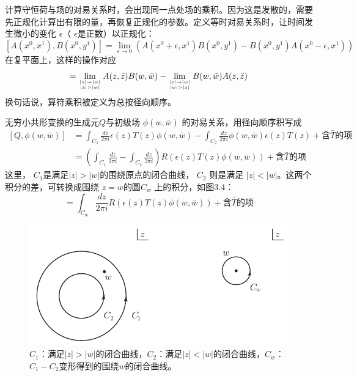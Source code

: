 计算守恒荷与场的对易关系时，会出现同一点处场的乘积。因为这是发散的，需要先正规化计算出有限的量，再恢复正规化的参数。定义等时对易关系时，让时间发生微小的变化 $\epsilon $（ $\epsilon $是正数）以正规化：
\[
\left[A\left(x^{0}, x^{1}\right), B\left(x^{0}, y^{1}\right)\right]= \lim _{\epsilon \rightarrow 0}\left(A\left(x^{0}+\epsilon, x^{1}\right) B\left(x^{0}, y^{1}\right)-B\left(x^{0}, y^{1}\right) A\left(x^{0}-\epsilon, x^{1}\right)\right)
\]
在复平面上，这样的操作对应
\begin{equation}
[A(z, \bar{z}), B(w, \bar{w})]=\lim _{|z| \rightarrow|w| \atop|z|>|w|} A(z, \bar{z}) B(w, \bar{w})-\lim _{|z| \rightarrow|w| \atop|w|>|z|} B(w, \bar{w}) A(z, \bar{z})
\end{equation}
换句话说，算符乘积被定义为总按径向顺序。

无穷小共形变换的生成元$ Q $与初级场 $\phi(w,\bar{w})$ 的对易关系，用径向顺序积写成
\begin{equation}
	\begin{aligned} \left[Q, \phi(w, \bar{w})\right]&=\int_{C_{1}} \frac{d z}{2 \pi i} \epsilon(z) T(z) \phi(w, \bar{w})-\int_{C_{2}} \frac{d z}{2 \pi i} \phi(w, \bar{w}) \epsilon(z) T(z)+\text{含}\bar{T}\text{的项}\\ &=\left(\int_{C_{1}} \frac{d z}{2 \pi i}-\int_{C_{2}} \frac{d z}{2 \pi i}\right) R(\epsilon(z) T(z) \phi(w, \bar{w}))+\text{含}\bar{T}\text{的项}\end{aligned}
\end{equation}
这里， $C_1 $是满足$ |z|>|w| $的围绕原点的闭合曲线， $C_2$ 则是满足 $|z|<|w| $。这两个积分的差，可转换成围绕 $z=w $的圆$ C_w$ 上的积分，如图3.4：
\begin{equation}
	[Q, \phi(w, \bar{w})]=\int_{C_{w}} \frac{d z}{2 \pi i} R(\epsilon(z) T(z) \phi(w, \bar{w}))+\text{含}\bar{T}\text{的项}
\end{equation}

\begin{figure}[h]
	\centering
	\includegraphics[width=0.6\linewidth]{fig/3.4}
	\caption{$C_1$：满足$|z| >|w|$的闭合曲线，$C_2$：满足$|z|<|w|$的闭合曲线，$C_w$：$C_1-C_2$变形得到的围绕$w$的闭合曲线。}
\end{figure}

